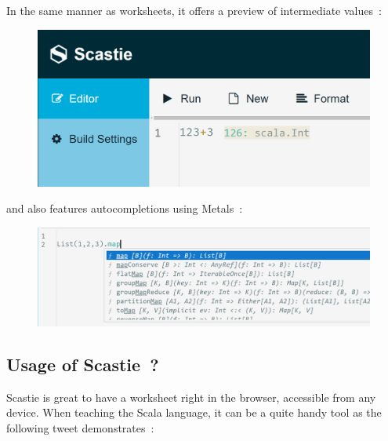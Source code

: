 \documentclass{article}
\begin{document}
In the same manner as worksheets, it offers a preview of intermediate values~:

\begin{figure}[H]
    \centering
    \includegraphics[width=0.7\columnwidth]{scastie_instrumentation.png}
\end{figure}

and also features autocompletions using Metals~:

\begin{figure}[H]
    \centering
    \includegraphics[width=0.7\columnwidth]{scastie_autocomplete.png}
\end{figure}

\subsection{Usage of Scastie~?}

Scastie is great to have a worksheet right in the browser, accessible from any device.
When teaching the Scala language, it can be a quite handy tool as the following tweet demonstrates~:
\end{document}
